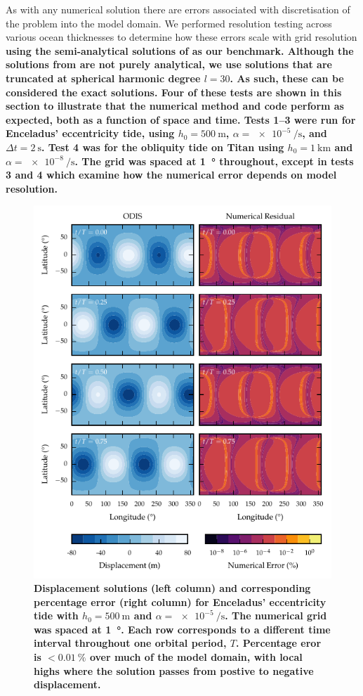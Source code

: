 As with any numerical solution there are errors associated with discretisation of the problem into the model domain. We performed resolution testing across various ocean thicknesses to determine how these errors scale with grid resolution \textbf{using the semi-analytical solutions of \citet{matsuyama2014tidal} as our benchmark. Although the solutions from \citet{matsuyama2014tidal} are not purely analytical, we use solutions that are truncated at spherical harmonic degree $l=30$. As such, these can be considered the exact solutions. Four of these tests are shown in this section to illustrate that the numerical method and code perform as expected, both as a function of space and time. Tests \numrange{1}{3} were run for Enceladus' eccentricity tide, using $h_0 = \SI{500}{\metre}$, $\alpha = \SI{e-5}{\per\second}$, and $\Delta t = \SI{2}{\second}$. Test 4 was for the obliquity tide on Titan using $h_0 = \SI{1}{\kilo\metre}$ and $\alpha = \SI{e-8}{\per\second}$. The grid was spaced at \SI{1}{\degree} throughout, except in tests 3 and 4 which examine how the numerical error depends on model resolution.}

\begin{figure}
\centering
\includegraphics[width=0.85\linewidth]{Figures/spatial_error_ecc}
\caption{\textbf{Displacement solutions (left column) and corresponding percentage error (right column) for Enceladus' eccentricity tide with $h_0 = \SI{500}{\metre}$ and $\alpha = \SI{e-5}{\per\second}$. The numerical grid was spaced at \SI{1}{\degree}. Each row corresponds to a different time interval throughout one orbital period, $T$. Percentage eror is  $< \SI{0.01}{\percent}$ over much of the model domain, with local highs where the solution passes from postive to negative displacement.} \label{fig:spatial_error}}
\end{figure}


